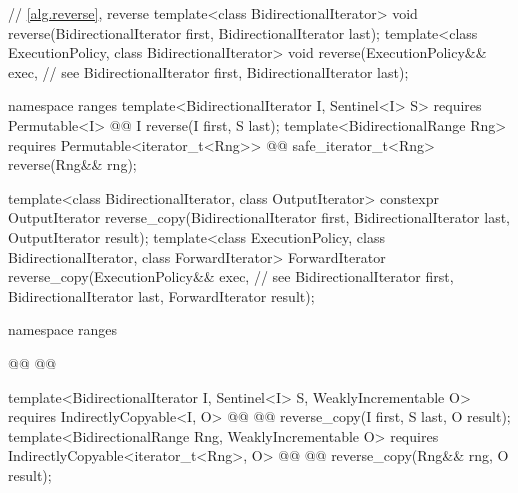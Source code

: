 \begin{codeblock}
  // \ref{alg.reverse}, reverse
  template<class BidirectionalIterator>
    void reverse(BidirectionalIterator first, BidirectionalIterator last);
  template<class ExecutionPolicy, class BidirectionalIterator>
    void reverse(ExecutionPolicy&& exec, // see 
                 BidirectionalIterator first, BidirectionalIterator last);
\end{codeblock}\begin{addedblock}\begin{codeblock}
  namespace ranges {
    template<BidirectionalIterator I, Sentinel<I> S>
      requires Permutable<I>
      @@ I reverse(I first, S last);
    template<BidirectionalRange Rng>
      requires Permutable<iterator_t<Rng>>
      @@ safe_iterator_t<Rng> reverse(Rng&& rng);
  }
\end{codeblock}\end{addedblock}\begin{codeblock}
  template<class BidirectionalIterator, class OutputIterator>
    constexpr OutputIterator
      reverse_copy(BidirectionalIterator first, BidirectionalIterator last,
                   OutputIterator result);
  template<class ExecutionPolicy, class BidirectionalIterator, class ForwardIterator>
    ForwardIterator
      reverse_copy(ExecutionPolicy&& exec, // see 
                   BidirectionalIterator first, BidirectionalIterator last,
                   ForwardIterator result);
\end{codeblock}\begin{addedblock}\begin{codeblock}
  namespace ranges {
    @@
    @@

    template<BidirectionalIterator I, Sentinel<I> S, WeaklyIncrementable O>
      requires IndirectlyCopyable<I, O>
      @@
      @@
        reverse_copy(I first, S last, O result);
    template<BidirectionalRange Rng, WeaklyIncrementable O>
      requires IndirectlyCopyable<iterator_t<Rng>, O>
      @@
      @@
        reverse_copy(Rng&& rng, O result);
  }
\end{codeblock}\end{addedblock}\begin{codeblock}


\end{codeblock}
